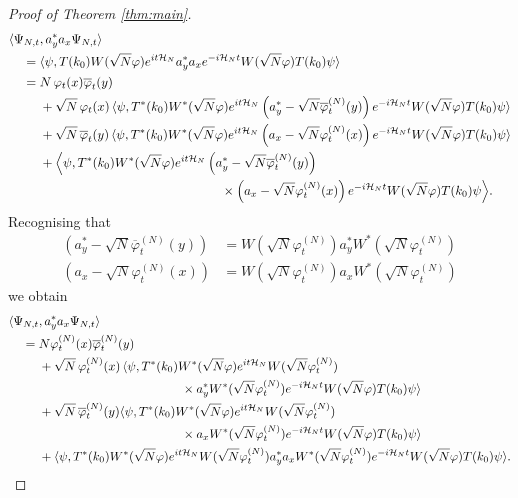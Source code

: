 \documentclass[11pt,a4paper]{article}
\newcommand{\cH}{{\cal H}}
\begin{document}
\begin{proof}[Proof of Theorem \ref{thm:main}]
\[\begin{split}
\langle \Psi_{N,t}  &, a_y^* a_x \Psi_{N,t} \rangle \\ = \;  & \langle \psi, T(k_0) W (\sqrt{N} \varphi) e^{it \cH_N} a_y^* a_x e^{-i\cH_N t} W(\sqrt{N} \varphi) T(k_0) \psi \rangle \\  = \; & N \, \varphi_t (x) \overline{\varphi}_t (y) \\ &+  \sqrt{N} \, \varphi_t (x) \, \langle \psi, T^* (k_0) W^* (\sqrt{N} \varphi) e^{it \cH_N} \left(a_y^* - \sqrt{N} \overline{\varphi}^{(N)}_t (y)\right) e^{-i\cH_N t} W(\sqrt{N} \varphi) T(k_0) \psi \rangle \\  &+ \sqrt{N} \, \overline{\varphi}_t (y) \,  \langle \psi, T^* (k_0) W^* (\sqrt{N} \varphi) e^{it \cH_N} \left(a_x - \sqrt{N} \varphi^{(N)}_t (x) \right) e^{-i\cH_N t} W(\sqrt{N} \varphi) T(k_0) \psi \rangle \\ &+ \Big\langle \psi , T^* (k_0) W^* (\sqrt{N} \varphi) e^{it \cH_N} \left(a_y^* -\sqrt{N} \overline{\varphi}_t^{(N)} (y)\right) \\ &\hspace{5cm} \times \left(a_x - \sqrt{N} \varphi^{(N)}_t (x) \right) e^{-i\cH_N t} W(\sqrt{N} \varphi) T(k_0) \psi \Big\rangle. \end{split}\]
Recognising that
\[ \begin{split} (a_y^* - \sqrt{N} \overline{\varphi}^{(N)}_t (y)) &= W (\sqrt{N} \varphi^{(N)}_t) a_y^* W^* (\sqrt{N} \varphi_t^{(N)}) \\ (a_x - \sqrt{N} \varphi^{(N)}_t (x)) &= W (\sqrt{N} \varphi^{(N)}_t) a_x W^* (\sqrt{N} \varphi_t^{(N)}) \end{split} \]
we obtain
\[ \begin{split} \langle \Psi_{N,t} &, a_y^* a_x \Psi_{N,t} \rangle \\ = \; &N \varphi_t^{(N)} (x) \overline{\varphi}_t^{(N)} (y) \\ &+ \sqrt{N} \, \varphi^{(N)}_t (x) \, \langle \psi, T^* (k_0) W^* (\sqrt{N} \varphi) e^{it \cH_N} W (\sqrt{N} \varphi^{(N)}_t) \\ &\hspace{4cm} \times a_y^* W^* (\sqrt{N} \varphi^{(N)}_t) e^{-i\cH_N t} W(\sqrt{N} \varphi) T(k_0) \psi \rangle \\  &+ \sqrt{N} \, \overline{\varphi}^{(N)}_t (y)  \langle \psi, T^* (k_0) W^* (\sqrt{N} \varphi) e^{it \cH_N} W (\sqrt{N} \varphi^{(N)}_t) \\ &\hspace{4cm} \times a_x W^* (\sqrt{N} \varphi^{(N)}_t) e^{-i\cH_N t} W(\sqrt{N} \varphi) T(k_0) \psi \rangle \\ &+ \langle \psi , T^* (k_0) W^* (\sqrt{N} \varphi) e^{it \cH_N} W (\sqrt{N} \varphi^{(N)}_t) a_y^* a_x W^* (\sqrt{N} \varphi^{(N)}_t)  e^{-i\cH_N t} W(\sqrt{N} \varphi) T(k_0) \psi \rangle. \end{split}\]

\end{proof}
\end{document}
